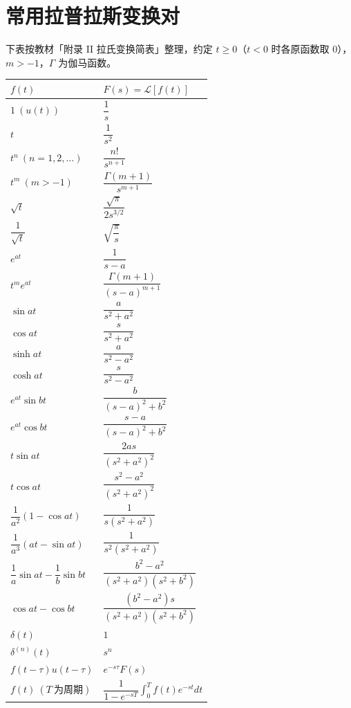 
\section{常用拉普拉斯变换对}

下表按教材「附录 II 拉氏变换简表」整理，约定 \(t\ge0\)（\(t<0\) 时各原函数取 0），\(m>-1\)，\(\Gamma\) 为伽马函数。

\begin{center}
\begin{tabular}{@{}ll@{}}
\toprule
\(f(t)\) & \(F(s)=\mathscr{L}[f(t)]\) \\
\midrule
\(1\ (u(t))\) & \(\dfrac{1}{s}\) \\
\(t\) & \(\dfrac{1}{s^2}\) \\
\(t^n\ (n=1,2,\dots)\) & \(\dfrac{n!}{s^{n+1}}\) \\
\(t^m\ (m>-1)\) & \(\dfrac{\Gamma(m+1)}{s^{m+1}}\) \\
\(\sqrt{t}\) & \(\dfrac{\sqrt{\pi}}{2s^{3/2}}\) \\
\(\dfrac{1}{\sqrt{t}}\) & \(\sqrt{\dfrac{\pi}{s}}\) \\
\(e^{at}\) & \(\dfrac{1}{s-a}\) \\
\(t^me^{at}\) & \(\dfrac{\Gamma(m+1)}{(s-a)^{m+1}}\) \\
\(\sin at\) & \(\dfrac{a}{s^2+a^2}\) \\
\(\cos at\) & \(\dfrac{s}{s^2+a^2}\) \\
\(\sinh at\) & \(\dfrac{a}{s^2-a^2}\) \\
\(\cosh at\) & \(\dfrac{s}{s^2-a^2}\) \\
\(e^{at}\sin bt\) & \(\dfrac{b}{(s-a)^2+b^2}\) \\
\(e^{at}\cos bt\) & \(\dfrac{s-a}{(s-a)^2+b^2}\) \\
\(t\sin at\) & \(\dfrac{2as}{(s^2+a^2)^2}\) \\
\(t\cos at\) & \(\dfrac{s^2-a^2}{(s^2+a^2)^2}\) \\
\(\dfrac{1}{a^2}\left(1-\cos at\right)\) & \(\dfrac{1}{s(s^2+a^2)}\) \\
\(\dfrac{1}{a^3}\left(at-\sin at\right)\) & \(\dfrac{1}{s^2(s^2+a^2)}\) \\
\(\dfrac{1}{a}\sin at-\dfrac{1}{b}\sin bt\) & \(\dfrac{b^2-a^2}{(s^2+a^2)(s^2+b^2)}\) \\
\(\cos at-\cos bt\) & \(\dfrac{(b^2-a^2)s}{(s^2+a^2)(s^2+b^2)}\) \\
\(\delta(t)\) & \(1\) \\
\(\delta^{(n)}(t)\) & \(s^n\) \\
\(f(t-\tau)u(t-\tau)\) & \(e^{-s\tau}F(s)\) \\
\(f(t)\ (T\ \text{为周期})\) & \(\dfrac{1}{1-e^{-sT}}\displaystyle\int_0^Tf(t)e^{-st}dt\) \\
\bottomrule
\end{tabular}
\end{center}

